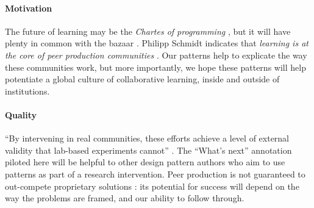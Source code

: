 \begin{refsection}
\paragraph{Motivation}  The future of learning may be
the \emph{Chartes of programming} \cite{alexander1999origins}, but it will have plenty in common with the
bazaar \cite{raymond2001cathedral}.
%
Philipp Schmidt indicates that \emph{learning is at the core of peer
  production communities} \cite{schmidt+commons-based+2009}.  Our
patterns help to explicate the way these communities work, but more
importantly, we hope these patterns will help potentiate a global
culture of collaborative learning, inside and outside of institutions.

\paragraph{Quality} 
``By intervening in real communities, these efforts achieve a level of
external validity that lab-based experiments cannot''
\cite{benkler2015peer}.  The ``What's next'' annotation piloted here
will be helpful to other design pattern authors who aim to use
patterns as part of a research intervention.  Peer production is not guaranteed to
  out-compete proprietary solutions
\cite{benkler2015peer,free-software-better}: its potential for
success will depend on the way the problems are framed,
and our ability to follow through.

\printbibliography[heading=subbibliography]

\end{refsection}
